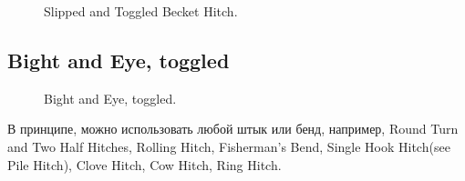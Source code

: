 \begin{figure}[H]\centering
	\begin{minipage}{1\linewidth}
		\begin{center}
			\tcbox[enhanced jigsaw,colframe=black,opacityframe=0.5,opacityback=0.5]
			{\centering{}}
		\end{center}
	\end{minipage}
\caption{Slipped and Toggled Becket Hitch.}
\label{ris:Slipped_and_Toggled_Becket_Hitch}
\end{figure}

\subsection{Bight and Eye, toggled}

\begin{figure}[H]\centering
	\begin{minipage}{1\linewidth}
		\begin{center}
			\tcbox[enhanced jigsaw,colframe=black,opacityframe=0.5,opacityback=0.5]
			{\centering{}}
		\end{center}
	\end{minipage}
\caption{Bight and Eye, toggled.}
\label{ris:Bight_and_Eye_toggled}
\end{figure}

В принципе, можно использовать любой штык или бенд, например, Round Turn and Two Half Hitches, Rolling Hitch, Fisherman’s Bend, Single Hook Hitch(see Pile Hitch), Clove Hitch, Cow Hitch, Ring Hitch.
